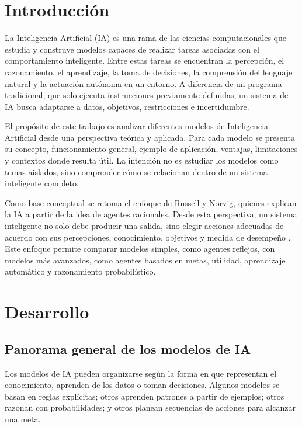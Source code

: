 \section{Introducción}

La Inteligencia Artificial (IA) es una rama de las ciencias computacionales que estudia y construye modelos capaces de realizar tareas asociadas con el comportamiento inteligente. Entre estas tareas se encuentran la percepción, el razonamiento, el aprendizaje, la toma de decisiones, la comprensión del lenguaje natural y la actuación autónoma en un entorno. A diferencia de un programa tradicional, que solo ejecuta instrucciones previamente definidas, un sistema de IA busca adaptarse a datos, objetivos, restricciones e incertidumbre.

El propósito de este trabajo es analizar diferentes modelos de Inteligencia Artificial desde una perspectiva teórica y aplicada. Para cada modelo se presenta su concepto, funcionamiento general, ejemplo de aplicación, ventajas, limitaciones y contextos donde resulta útil. La intención no es estudiar los modelos como temas aislados, sino comprender cómo se relacionan dentro de un sistema inteligente completo.

Como base conceptual se retoma el enfoque de Russell y Norvig, quienes explican la IA a partir de la idea de agentes racionales. Desde esta perspectiva, un sistema inteligente no solo debe producir una salida, sino elegir acciones adecuadas de acuerdo con sus percepciones, conocimiento, objetivos y medida de desempeño \cite{russell2012}. Este enfoque permite comparar modelos simples, como agentes reflejos, con modelos más avanzados, como agentes basados en metas, utilidad, aprendizaje automático y razonamiento probabilístico.

\section{Desarrollo}

\subsection{Panorama general de los modelos de IA}

Los modelos de IA pueden organizarse según la forma en que representan el conocimiento, aprenden de los datos o toman decisiones. Algunos modelos se basan en reglas explícitas; otros aprenden patrones a partir de ejemplos; otros razonan con probabilidades; y otros planean secuencias de acciones para alcanzar una meta.

